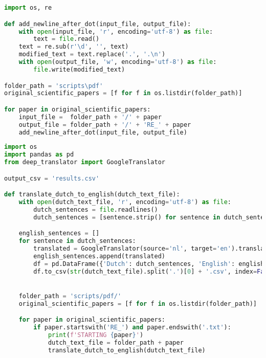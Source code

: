 \chapter{}%
\label{ch:bijlage-code}

\begin{lstlisting}[language=Python, caption={Script voor fase 1 van de vergelijkende studie.}, label={code:verg-studie-phase-1}]
import os, re

def add_newline_after_dot(input_file, output_file):
	with open(input_file, 'r', encoding='utf-8') as file:
		text = file.read()
	text = re.sub(r'\d', '', text)
	modified_text = text.replace('.', '.\n')
	with open(output_file, 'w', encoding='utf-8') as file:
		file.write(modified_text)

folder_path = 'scripts\pdf'
original_scientific_papers = [f for f in os.listdir(folder_path)]

for paper in original_scientific_papers:
	input_file =  folder_path + '/' + paper
	output_file = folder_path + '/' + 'RE_' + paper
	add_newline_after_dot(input_file, output_file)
\end{lstlisting}

\newpage

\begin{center}
	\begin{lstlisting}[language=Python, caption={Script voor de tweede fase van de vergelijkende studie.}, label={code:verg-studie-phase-2}]
import os
import pandas as pd
from deep_translator import GoogleTranslator

output_csv = 'results.csv'

def translate_dutch_to_english(dutch_text_file):
	with open(dutch_text_file, 'r', encoding='utf-8') as file:
		dutch_sentences = file.readlines()
		dutch_sentences = [sentence.strip() for sentence in dutch_sentences]

	english_sentences = []
	for sentence in dutch_sentences:
		translated = GoogleTranslator(source='nl', target='en').translate(sentence)
		english_sentences.append(translated)
		df = pd.DataFrame({'Dutch': dutch_sentences, 'English': english_sentences})
		df.to_csv(str(dutch_text_file).split('.')[0] + '.csv', index=False)


	folder_path = 'scripts/pdf/'
	original_scientific_papers = [f for f in os.listdir(folder_path)]

	for paper in original_scientific_papers:
		if paper.startswith('RE_') and paper.endswith('.txt'):
			print(f'STARTING {paper}')
			dutch_text_file = folder_path + paper
			translate_dutch_to_english(dutch_text_file)
	\end{lstlisting}
\end{center}

